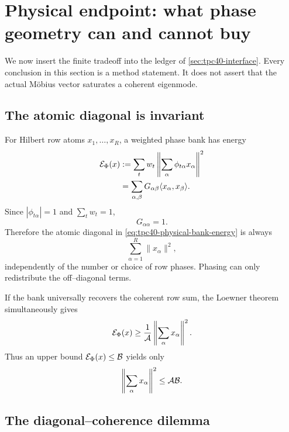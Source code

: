\section{Physical endpoint: what phase geometry can and cannot buy}
\label{sec:tpc40-physical-endpoint}

We now insert the finite tradeoff into the ledger of
\cref{sec:tpc40-interface}.  Every conclusion in this section is a method
statement.  It does not assert that the actual M\"obius vector saturates a
coherent eigenmode.

\subsection{The atomic diagonal is invariant}

For Hilbert row atoms \(x_1,\ldots,x_R\), a weighted phase bank has energy
\begin{align}
 \mathcal E_{\Phi}(x)
 &:=\sum_tw_t\left\|\sum_\alpha
 \phi_{t\alpha}x_\alpha\right\|^2
 \notag\\
 &=\sum_{\alpha,\beta}
 G_{\alpha\beta}\langle x_\alpha,x_\beta\rangle.
 \label{eq:tpc40-physical-bank-energy}
\end{align}
Since \(|\phi_{t\alpha}|=1\) and \(\sum_tw_t=1\),
\begin{equation}
 G_{\alpha\alpha}=1.
 \label{eq:tpc40-physical-unit-diagonal}
\end{equation}
Therefore the atomic diagonal in \eqref{eq:tpc40-physical-bank-energy} is
always
\begin{equation}
 \boxed{\sum_{\alpha=1}^{R}\|x_\alpha\|^2,}
 \label{eq:tpc40-physical-diagonal-invariance}
\end{equation}
independently of the number or choice of row phases.  Phasing can only
redistribute the off--diagonal terms.

If the bank universally recovers the coherent row sum, the Loewner
theorem simultaneously gives
\begin{equation}
 \mathcal E_{\Phi}(x)
 \ge\frac1{\mathcal A}
 \left\|\sum_\alpha x_\alpha\right\|^2.
 \label{eq:tpc40-physical-energy-dominates-target}
\end{equation}
Thus an upper bound \(\mathcal E_{\Phi}(x)\le\mathcal B\) yields only
\begin{equation}
 \left\|\sum_\alpha x_\alpha\right\|^2
 \le\mathcal A\mathcal B.
 \label{eq:tpc40-physical-recovery-cost}
\end{equation}

\subsection{The diagonal--coherence dilemma}

